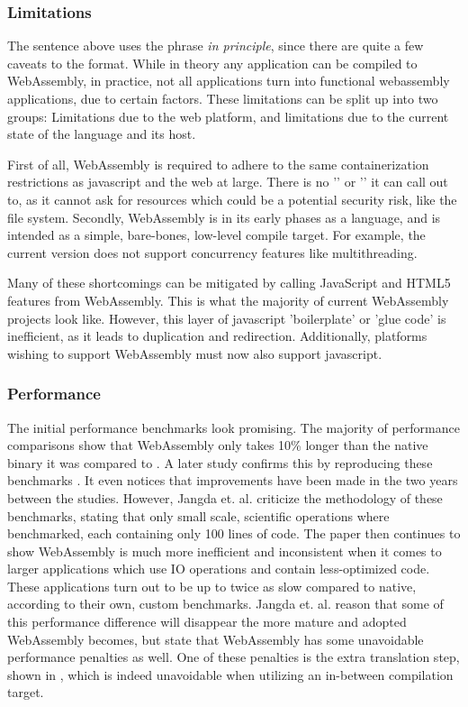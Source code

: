 \subsubsection*{Limitations}

The sentence above uses the phrase \emph{in principle}, since there are quite a few caveats to the format. 
While in theory any application can be compiled to WebAssembly, in practice, not all applications turn into functional webassembly applications, due to certain factors.
These limitations can be split up into two groups: 
Limitations due to the web platform, and limitations due to the current state of the language and its host.

First of all, WebAssembly is required to adhere to the same containerization restrictions as javascript and the web at large. 
There is no '' or '' it can call out to, as it cannot ask for resources which could be a potential security risk, like the file system.
Secondly, WebAssembly is in its early phases as a language, and is intended as a simple, bare-bones, low-level compile target. 
For example, the current version does not support concurrency features like multithreading.

Many of these shortcomings can be mitigated by calling JavaScript and HTML5 features from WebAssembly. 
This is what the majority of current WebAssembly projects look like. 
However, this layer of javascript 'boilerplate' or 'glue code' is inefficient, as it leads to duplication and redirection.
Additionally, platforms wishing to support WebAssembly must now also support javascript. 

\subsubsection*{Performance}

The initial performance benchmarks look promising. The majority of performance comparisons show that WebAssembly only takes 10\% longer than the native binary it was compared to \cite{haas_bringing_2017}. A later study confirms this by reproducing these benchmarks \cite{jangda_not_2019}. It even notices that improvements have been made in the two years between the studies. However, Jangda et. al. criticize the methodology of these benchmarks, stating that only small scale, scientific operations where benchmarked, each containing only 100 lines of code. The paper then continues to show WebAssembly is much more inefficient and inconsistent when it comes to larger applications which use IO operations and contain less-optimized code. These applications turn out to be up to twice as slow compared to native, according to their own, custom benchmarks. 
Jangda et. al. reason that some of this performance difference will disappear the more mature and adopted WebAssembly becomes, but state that WebAssembly has some unavoidable performance penalties as well. 
One of these penalties is the extra translation step, shown in , which is indeed unavoidable when utilizing an in-between compilation target. 

